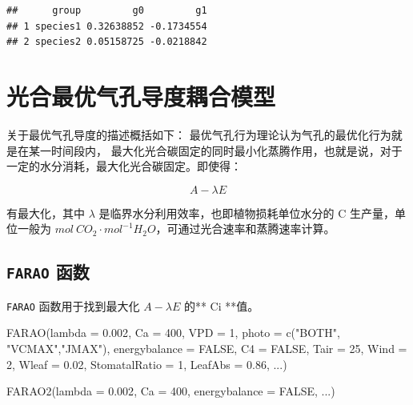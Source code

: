 \documentclass[
]{krantz}
\makeatletter
\newenvironment{Shaded}{\begin{snugshade}}{\end{snugshade}}
\newcommand{\AttributeTok}[1]{\textcolor[rgb]{0.77,0.63,0.00}{#1}}
\newcommand{\ConstantTok}[1]{\textcolor[rgb]{0.00,0.00,0.00}{#1}}
\newcommand{\DecValTok}[1]{\textcolor[rgb]{0.00,0.00,0.81}{#1}}
\newcommand{\FloatTok}[1]{\textcolor[rgb]{0.00,0.00,0.81}{#1}}
\newcommand{\FunctionTok}[1]{\textcolor[rgb]{0.00,0.00,0.00}{#1}}
\newcommand{\NormalTok}[1]{#1}
\newcommand{\StringTok}[1]{\textcolor[rgb]{0.31,0.60,0.02}{#1}}
\newenvironment{kframe}{%
\medskip{}
\setlength{\fboxsep}{.8em}
 \def\at@end@of@kframe{}%
 \ifinner\ifhmode%
  \def\at@end@of@kframe{\end{minipage}}%
  \begin{minipage}{\columnwidth}%
 \fi\fi%
 \def\FrameCommand##1{\hskip\@totalleftmargin \hskip-\fboxsep
 \colorbox{shadecolor}{##1}\hskip-\fboxsep
     \hskip-\linewidth \hskip-\@totalleftmargin \hskip\columnwidth}%
 \MakeFramed {\advance\hsize-\width
   \@totalleftmargin\z@ \linewidth\hsize
   \@setminipage}}%
 {\par\unskip\endMakeFramed%
 \at@end@of@kframe}
\renewenvironment{Shaded}{\begin{kframe}}{\end{kframe}}
\makeatother
\begin{document}
\begin{verbatim}
##      group         g0         g1
## 1 species1 0.32638852 -0.1734554
## 2 species2 0.05158725 -0.0218842
\end{verbatim}

\cleardoublepage

\hypertarget{stomotal_couple}{%
\chapter{光合最优气孔导度耦合模型}\label{stomotal_couple}}

\citet{Cowan1977Stomatal} 关于最优气孔导度的描述概括如下：
最优气孔行为理论认为气孔的最优化行为就是在某一时间段内， 最大化光合碳固定的同时最小化蒸腾作用，也就是说，对于一定的水分消耗，最大化光合碳固定。即使得：

\begin{equation}
A - \lambda E
\label{eq:weff}
\end{equation}

有最大化，其中 \(\lambda\) 是临界水分利用效率，也即植物损耗单位水分的 C 生产量，单位一般为 \(mol \: CO_2 \cdot mol^{-1} H_2O\)，可通过光合速率和蒸腾速率计算。

\hypertarget{farao}{%
\section{\texorpdfstring{\texttt{FARAO} 函数}{FARAO 函数}}\label{farao}}

\texttt{FARAO} 函数用于找到最大化 \(A - \lambda E\) 的** Ci **值。

\begin{Shaded}
\begin{Highlighting}[]
\FunctionTok{FARAO}\NormalTok{(}\AttributeTok{lambda =} \FloatTok{0.002}\NormalTok{, }\AttributeTok{Ca =} \DecValTok{400}\NormalTok{, }\AttributeTok{VPD =} \DecValTok{1}\NormalTok{,}
      \AttributeTok{photo =} \FunctionTok{c}\NormalTok{(}\StringTok{"BOTH"}\NormalTok{, }\StringTok{"VCMAX"}\NormalTok{,}\StringTok{"JMAX"}\NormalTok{), }
      \AttributeTok{energybalance =} \ConstantTok{FALSE}\NormalTok{, }\AttributeTok{C4 =} \ConstantTok{FALSE}\NormalTok{, }
      \AttributeTok{Tair =} \DecValTok{25}\NormalTok{, }\AttributeTok{Wind =} \DecValTok{2}\NormalTok{, }\AttributeTok{Wleaf =} \FloatTok{0.02}\NormalTok{,}
      \AttributeTok{StomatalRatio =} \DecValTok{1}\NormalTok{, }\AttributeTok{LeafAbs =} \FloatTok{0.86}\NormalTok{, ...)}

\FunctionTok{FARAO2}\NormalTok{(}\AttributeTok{lambda =} \FloatTok{0.002}\NormalTok{, }\AttributeTok{Ca =} \DecValTok{400}\NormalTok{, }
       \AttributeTok{energybalance =} \ConstantTok{FALSE}\NormalTok{, ...)}
\end{Highlighting}
\end{Shaded}
\end{document}
